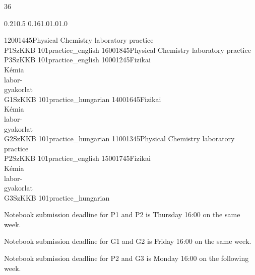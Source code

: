 \documentclass[a4paper,10pt]{report}
\begin{document}
\thispagestyle{empty}
\begin{landscape}
\noindent{}

\setslotsize{2.8cm}{0.3cm}
 {36}
\settextframe{0.8mm}



       {0.21}{0.5} {0.16}{1.0}{1.0}{1.0}

\begin{timetable}
   {1200}{1445}{Physical Chemistry laboratory practice \\ P1}{SzKK}{B 101}{practice_english}
   {1600}{1845}{Physical Chemistry laboratory practice \\ P3}{SzKK}{B 101}{practice_english}
   {1000}{1245}{Fizikai \\ Kémia \\ labor-\\gyakorlat \\ G1}{SzKK}{B 101}{practice_hungarian}
   {1400}{1645}{Fizikai \\ Kémia \\ labor-\\gyakorlat \\ G2}{SzKK}{B 101}{practice_hungarian}
   {1100}{1345}{Physical Chemistry laboratory practice \\ P2}{SzKK}{B 101}{practice_english}
   {1500}{1745}{Fizikai \\ Kémia \\ labor-\\gyakorlat \\ G3}{SzKK}{B 101}{practice_hungarian}
\end{timetable}

Notebook submission deadline for P1 and P2 is Thursday 16:00 on the same week.

Notebook submission deadline for G1 and G2 is Friday 16:00 on the same week.

Notebook submission deadline for P2 and G3 is Monday 16:00 on the following week.

\end{landscape}
\end{document}
